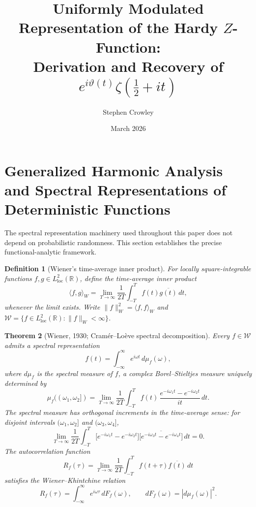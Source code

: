 \documentclass[11pt,a4paper]{article}
\title{Uniformly Modulated Representation of the Hardy $Z$-Function:\\
Derivation and Recovery of $e^{i\vartheta(t)}\zeta(\tfrac{1}{2}+it)$}
\author{Stephen Crowley}
\date{March 2026}
\newtheorem{theorem}{Theorem}
\newtheorem{definition}[theorem]{Definition}
\begin{document}
\maketitle

\section{Generalized Harmonic Analysis and Spectral Representations of Deterministic Functions}

The spectral representation machinery used throughout this paper does not
depend on probabilistic randomness. This section establishes the precise
functional-analytic framework.

\begin{definition}[Wiener's time-average inner product]
\label{def:wiener-ip}
For locally square-integrable functions $f,g\in L^2_{\mathrm{loc}}(\mathbb{R})$,
define the \emph{time-average inner product}
\begin{equation}
  \langle f,g\rangle_W
  =\lim_{T\to\infty}\frac{1}{2T}\int_{-T}^{T}f(t)\overline{g(t)}\,dt,
\end{equation}
whenever the limit exists. Write
$\|f\|_W^2=\langle f,f\rangle_W$
and $\mathcal{W}=\{f\in L^2_{\mathrm{loc}}(\mathbb{R}):\|f\|_W<\infty\}$.
\end{definition}

\begin{theorem}[Wiener, 1930; Cram\'er--Lo\`eve spectral decomposition]
\label{thm:cramer}
Every $f\in\mathcal{W}$ admits a spectral representation
\begin{equation}
  \label{eq:cramer-rep}
  f(t)=\int_{-\infty}^{\infty}e^{i\omega t}\,d\mu_f(\omega),
\end{equation}
where $d\mu_f$ is the \emph{spectral measure of $f$}, a complex
Borel--Stieltjes measure uniquely determined by
\begin{equation}
  \mu_f((\omega_1,\omega_2])
  =\lim_{T\to\infty}\frac{1}{2T}\int_{-T}^{T}
   f(t)\,\frac{e^{-i\omega_1 t}-e^{-i\omega_2 t}}{it}\,dt.
\end{equation}
The spectral measure has orthogonal increments in the time-average sense:
for disjoint intervals $(\omega_1,\omega_2]$ and $(\omega_3,\omega_4]$,
\begin{equation}
  \lim_{T\to\infty}\frac{1}{2T}\int_{-T}^{T}
  \bigl[e^{-i\omega_1 t}-e^{-i\omega_2 t}\bigr]
  \overline{\bigl[e^{-i\omega_3 t}-e^{-i\omega_4 t}\bigr]}\,dt
  =0.
\end{equation}
The autocorrelation function
\begin{equation}
  R_f(\tau)=\lim_{T\to\infty}\frac{1}{2T}\int_{-T}^{T}
            f(t+\tau)\overline{f(t)}\,dt
\end{equation}
satisfies the Wiener--Khintchine relation
\begin{equation}
  \label{eq:wk}
  R_f(\tau)=\int_{-\infty}^{\infty}e^{i\omega\tau}\,dF_f(\omega),
  \qquad
  dF_f(\omega)=|d\mu_f(\omega)|^2.
\end{equation}
\end{theorem}
\end{document}
